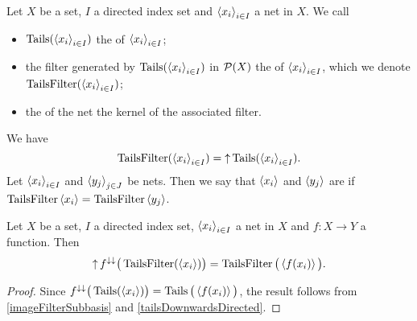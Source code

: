 \begin{definition}
Let $X$ be a set, $I$ a directed index set and $\seq{x_i}_{i\in I}$ a net in $X$. We call
\begin{itemize}
\item $\Tails(\seq{x_i}_{i\in I})$ the  of $\seq{x_i}_{i\in I}$;
\item the filter generated by $\Tails(\seq{x_i}_{i\in I})$ in $\powerset(X)$ the  of $\seq{x_i}_{i\in I}$, which we denote $\TailsFilter(\seq{x_i}_{i\in I})$;
\item the  of the net the kernel of the associated filter.
\end{itemize}
We have 
\[ \TailsFilter(\seq{x_i}_{i\in I}) = \upset \Tails(\seq{x_i}_{i\in I}). \]
Let $\seq{x_i}_{i\in I}$ and $\seq{y_j}_{j\in J}$ be nets. Then we say that $\seq{x_i}$ and $\seq{y_j}$ are  if $\TailsFilter\seq{x_i} = \TailsFilter\seq{y_j}$.
\end{definition}

\begin{lemma} \label{imageTailsFilter}
Let $X$ be a set, $I$ a directed index set, $\seq{x_i}_{i\in I}$ a net in $X$ and $f:X\to Y$ a function. Then
\[ \upset f^{\imf\imf}\big(\TailsFilter(\seq{x_i})\big) = \TailsFilter\big(\seq{f(x_i)}\big). \]
\end{lemma}
\begin{proof}
Since $f^{\imf\imf}\big(\Tails(\seq{x_i})\big) = \Tails\big(\seq{f(x_i)}\big)$, the result follows from 
\ref{imageFilterSubbasis} and \ref{tailsDownwardsDirected}.
\end{proof}

